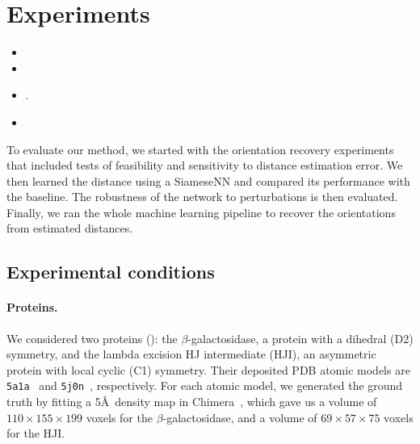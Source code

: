 \section{Experiments}\label{sec:experiments}

\begin{itemize}
    \item {}
    \item {}
    \item {}.
    \item {}
\end{itemize}

To evaluate our method, we started with the orientation recovery experiments that included tests of feasibility and sensitivity to distance estimation error.
We then learned the distance using a SiameseNN and compared its performance with the baseline.
The robustness of the network to perturbations is then evaluated.
Finally, we ran the whole machine learning pipeline to recover the orientations from estimated distances.

\subsection{Experimental conditions}\label{sec:results:data}

\paragraph{Proteins.}
We considered two proteins (): the $\beta$-galactosidase, a protein with a dihedral (D2) symmetry, and the lambda excision HJ intermediate (HJI), an asymmetric protein with local cyclic (C1) symmetry.
Their deposited PDB atomic models are \texttt{5a1a}~\cite{bartesaghi2015betagal} and \texttt{5j0n}~\cite{laxmikanthan2016structure}, respectively.
For each atomic model, we generated the ground truth by fitting a 5\AA\ density map in Chimera~\cite{pettersen2004ucsf}, which gave us a volume of $110 \times 155 \times 199$ voxels for the $\beta$-galactosidase, and a volume of $69 \times 57 \times 75$ voxels for the HJI.

